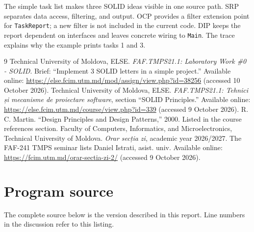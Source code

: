\documentclass{utmreport}
\begin{document}
\utmconclusions
The simple task list makes three SOLID ideas visible in one source path. SRP separates data access, filtering, and output. OCP provides a filter extension point for \texttt{TaskReport}; a new filter is not included in the current code. DIP keeps the report dependent on interfaces and leaves concrete wiring to \texttt{Main}. The trace explains why the example prints tasks 1 and 3.

\begin{thebibliography}{9}
 Technical University of Moldova, ELSE. \textit{FAF.TMPS21.1: Laboratory Work \#0 - SOLID}. Brief: ``Implement 3 SOLID letters in a simple project.'' Available online: \url{https://else.fcim.utm.md/mod/assign/view.php?id=38256} (accessed 10 October 2026).
 Technical University of Moldova, ELSE. \textit{FAF.TMPS21.1: Tehnici și mecanisme de proiectare software}, section ``SOLID Principles.'' Available online: \url{https://else.fcim.utm.md/course/view.php?id=339} (accessed 9 October 2026).
 R. C. Martin. ``Design Principles and Design Patterns,'' 2000. Listed in the course references section.
 Faculty of Computers, Informatics, and Microelectronics, Technical University of Moldova. \textit{Orar secția zi}, academic year 2026/2027. The FAF-241 TMPS seminar lists Daniel Istrati, asist. univ. Available online: \url{https://fcim.utm.md/orar-sectia-zi-2/} (accessed 9 October 2026).
\end{thebibliography}

\appendix
\chapter{Program source}\label{app:source}
The complete source below is the version described in this report. Line numbers in the discussion refer to this listing.

\end{document}
